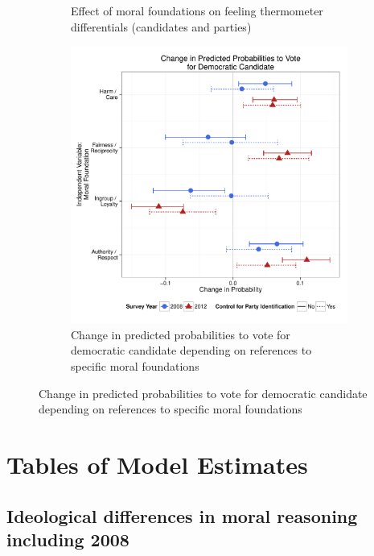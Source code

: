 \documentclass[12pt]{article}
\begin{document}
\begin{figure}[h]
\begin{subfigure}[t]{0.49\textwidth}
    \caption{Effect of moral foundations on feeling thermometer differentials (candidates and parties)}\label{fig:appD11feel}
  \end{subfigure}
  \begin{subfigure}[t]{0.49\textwidth}
    \includegraphics[scale=.35]{../calc/fig/appD12vote.pdf}
    \caption{Change in predicted probabilities to vote for democratic candidate depending on references to specific moral foundations}\label{fig:appD12vote}
  \end{subfigure}
\end{figure}


\clearpage
\section{Tables of Model Estimates}\label{app:tables}
\renewcommand\thefigure{\thesection.\arabic{figure}}
\renewcommand\thetable{\thesection.\arabic{table}}
\setcounter{figure}{0}
\setcounter{table}{0}


\subsection{Ideological differences in moral reasoning including 2008}










\end{document}
